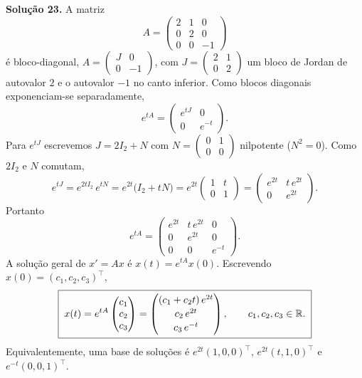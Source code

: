 \bigskip\noindent\textbf{Solução 23.}\quad
A matriz
\[
    A=\begin{pmatrix} 2&1&0\\ 0&2&0\\ 0&0&-1\end{pmatrix}
\]
é bloco-diagonal, $A=\begin{pmatrix}J&0\\0&-1\end{pmatrix}$, com $J=\begin{pmatrix}2&1\\0&2\end{pmatrix}$ um bloco de Jordan de autovalor $2$ e o autovalor $-1$ no canto inferior. Como blocos diagonais exponenciam-se separadamente,
\[
    e^{tA}=\begin{pmatrix} e^{tJ}&0\\ 0&e^{-t}\end{pmatrix}.
\]
Para $e^{tJ}$ escrevemos $J=2I_2+N$ com $N=\begin{pmatrix}0&1\\0&0\end{pmatrix}$ nilpotente ($N^2=0$). Como $2I_2$ e $N$ comutam,
\[
    e^{tJ}=e^{2t I_2}\,e^{tN}=e^{2t}\big(I_2+tN\big)
          =e^{2t}\begin{pmatrix}1&t\\0&1\end{pmatrix}
          =\begin{pmatrix} e^{2t}&t\,e^{2t}\\ 0&e^{2t}\end{pmatrix}.
\]
Portanto
\[
    \boxed{\;
    e^{tA}=\begin{pmatrix}
        e^{2t} & t\,e^{2t} & 0\\
        0 & e^{2t} & 0\\
        0 & 0 & e^{-t}
    \end{pmatrix}.
    \;}
\]
A solução geral de $x'=Ax$ é $x(t)=e^{tA}x(0)$. Escrevendo $x(0)=(c_1,c_2,c_3)^{\!\top}$,
\[
    \boxed{\;
    x(t)=e^{tA}\begin{pmatrix}c_1\\c_2\\c_3\end{pmatrix}
        =\begin{pmatrix}
            (c_1+c_2 t)\,e^{2t}\\[2pt]
            c_2\,e^{2t}\\[2pt]
            c_3\,e^{-t}
        \end{pmatrix},
    \qquad c_1,c_2,c_3\in\mathbb{R} .
    \;}
\]
Equivalentemente, uma base de soluções é $e^{2t}(1,0,0)^{\!\top}$, $e^{2t}(t,1,0)^{\!\top}$ e $e^{-t}(0,0,1)^{\!\top}$.


